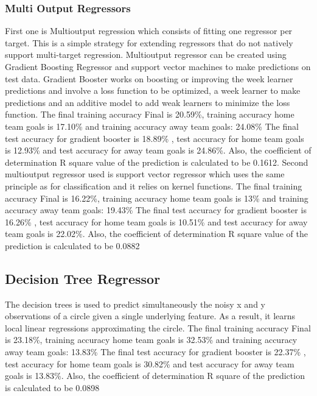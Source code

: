\subsubsection{Multi Output Regressors}
First one is Multioutput regression which consists of fitting one regressor per target. This is a simple strategy for extending regressors that do not natively support multi-target regression. Multioutput regressor can be created using Gradient Boosting Regressor and support vector machines to make predictions on test data.\newline \newline %
Gradient Booster works on boosting or improving the week learner predictions and involve a loss function to be optimized, a week learner to make predictions and an additive model to add weak learners to minimize the loss function. \newline
The final training accuracy Final is 20.59\%, training accuracy home team goals is 17.10\% and training accuracy away team goals: 24.08\% \newline
The final test accuracy for gradient booster is 18.89\% , test accuracy for home team goals is 12.93\% and test accuracy for away team goals is 24.86\%. Also, the coefficient of determination R square value of the prediction is calculated to be 0.1612.\newline
Second multioutput regressor used is support vector regressor which uses the same principle as for classification and it relies on kernel functions.
The final training accuracy Final is 16.22\%, training accuracy home team goals is 13\% and training accuracy away team goals: 19.43\% \newline
The final test accuracy for gradient booster is 16.26\% , test accuracy for home team goals is 10.51\% and test accuracy for away team goals is 22.02\%. Also, the coefficient of determination R square value of the prediction is calculated to be 0.0882 \newline
\subsection{Decision Tree Regressor}
The decision trees is used to predict simultaneously the noisy x and y observations of a circle given a single underlying feature. As a result, it learns local linear regressions approximating the circle.\newline
The final training accuracy Final is 23.18\%, training accuracy home team goals is 32.53\% and training accuracy away team goals: 13.83\% \newline
The final test accuracy for gradient booster is 22.37\% , test accuracy for home team goals is 30.82\% and test accuracy for away team goals is 13.83\%. Also, the coefficient of determination R square of the prediction is calculated to be 0.0898\newline 
